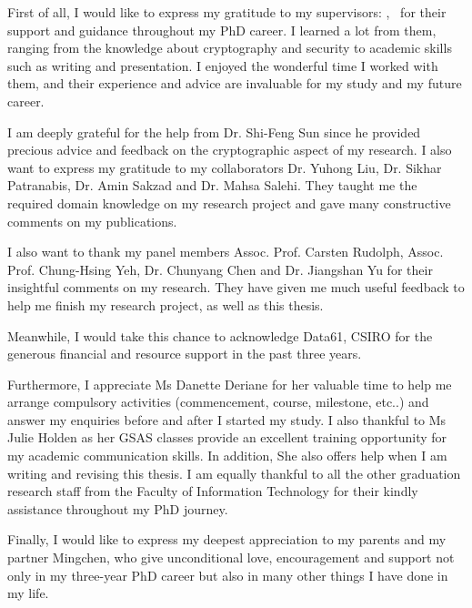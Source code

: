 \begin{acknowledgements}
	First of all, I would like to express my gratitude to my supervisors: \supervisorname, \cosupervisorname~for their support and guidance throughout my PhD career.
	I learned a lot from them, ranging from the knowledge about cryptography and security to academic skills such as writing and presentation.
	I enjoyed the wonderful time I worked with them, and their experience and advice are invaluable for my study and my future career.

	I am deeply grateful for the help from Dr. Shi-Feng Sun since he provided precious advice and feedback on the cryptographic aspect of my research.
	I also want to express my gratitude to my collaborators Dr. Yuhong Liu, Dr. Sikhar Patranabis, Dr. Amin Sakzad and Dr. Mahsa Salehi. 
	They taught me the required domain knowledge on my research project and gave many constructive comments on my publications. 
		
	I also want to thank my panel members Assoc. Prof. Carsten Rudolph, Assoc. Prof. Chung-Hsing Yeh, Dr. Chunyang Chen and Dr. Jiangshan Yu for their insightful comments on my research.
	They have given me much useful feedback to help me finish my research project, as well as this thesis.
		
	Meanwhile, I would take this chance to acknowledge Data61, CSIRO for the generous financial and resource support in the past three years. 
	
	Furthermore, I appreciate Ms Danette Deriane for her valuable time to help me arrange compulsory activities (commencement, course, milestone, etc..) and answer my enquiries before and after I started my study.
	I also thankful to Ms Julie Holden as her GSAS classes provide an excellent training opportunity for my academic communication skills.
	In addition, She also offers help when I am writing and revising this thesis.
	I am equally thankful to all the other graduation research staff from the Faculty of Information Technology for their kindly assistance throughout my PhD journey.
	
	Finally, I would like to express my deepest appreciation to my parents and my partner Mingchen, who give unconditional love, encouragement and support not only in my three-year PhD career but also in many other things I have done in my life.
\end{acknowledgements}

